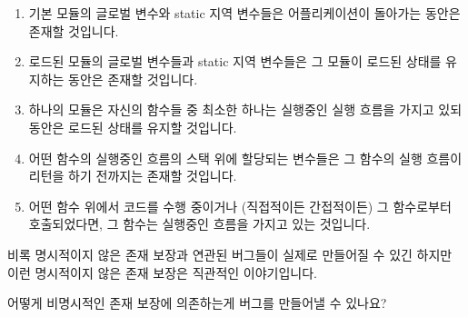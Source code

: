 \begin{enumerate}
\item	기본 모듈의 글로벌 변수와 static 지역 변수들은 어플리케이션이 돌아가는
	동안은 존재할 것입니다.
\item	로드된 모듈의 글로벌 변수들과 static 지역 변수들은 그 모듈이 로드된
	상태를 유지하는 동안은 존재할 것입니다.
\item	하나의 모듈은 자신의 함수들 중 최소한 하나는 실행중인 실행 흐름을
	가지고 있되 동안은 로드된 상태를 유지할 것입니다.
\item	어떤 함수의 실행중인 흐름의 스택 위에 할당되는 변수들은 그 함수의 실행
	흐름이 리턴을 하기 전까지는 존재할 것입니다.
\item	어떤 함수 위에서 코드를 수행 중이거나 (직접적이든 간접적이든) 그
	함수로부터 호출되었다면, 그 함수는 실행중인 흐름을 가지고 있는
	것입니다.
\iffalse
\item	Global variables and static local variables in the base module
	will exist as long as the application is running.
\item	Global variables and static local variables in a loaded module
	will exist as long as that module remains loaded.
\item	A module will remain loaded as long as at least one of its functions
	has an active instance.
\item	A given function instance's on-stack variables will exist until
	that instance returns.
\item	If you are executing within a given function or have been
	called (directly or indirectly) from that function,
	then the given function has an active instance.
\fi
\end{enumerate}

비록 명시적이지 않은 존재 보장과 연관된 버그들이 실제로 만들어질 수 있긴 하지만
이런 명시적이지 않은 존재 보장은 직관적인 이야기입니다.
\iffalse

These implicit existence guarantees are straightforward, though
bugs involving implicit existence guarantees really can happen.
\fi

\QuickQuiz{}
	어떻게 비명시적인 존재 보장에 의존하는게 버그를 만들어낼 수 있나요?
	\iffalse

